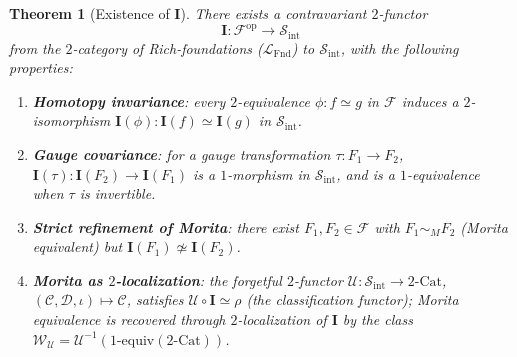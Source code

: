 \documentclass[11pt]{article}
\theoremstyle{plain}
\newtheorem{theorem}{Theorem}[section]
\theoremstyle{definition}
\newcommand{\cS}{\mathcal{S}}
\newcommand{\cF}{\mathcal{F}}
\newcommand{\cC}{\mathcal{C}}
\newcommand{\cD}{\mathcal{D}}
\newcommand{\LFnd}{\mathcal{L}_{\mathrm{Fnd}}}
\newcommand{\Sint}{\cS_{\mathrm{int}}}
\newcommand{\Cat}{\mathrm{Cat}}
\newcommand{\II}{\mathbf{I}}
\newcommand{\cU}{\mathcal{U}}
\begin{document}
\begin{theorem}[Existence of $\II$]\label{thm:I-existence}
There exists a contravariant $2$-functor
\[ \II : \cF^{\mathrm{op}} \to \Sint \]
from the $2$-category of Rich-foundations ($\LFnd$) to $\Sint$, with the following properties:
\begin{enumerate}
\item[\textbf{(I-1)}] \textbf{Homotopy invariance}: every $2$-equivalence $\phi : f \simeq g$ in $\cF$ induces a $2$-isomorphism $\II(\phi) : \II(f) \simeq \II(g)$ in $\Sint$.
\item[\textbf{(I-2)}] \textbf{Gauge covariance}: for a gauge transformation $\tau : F_1 \to F_2$, $\II(\tau) : \II(F_2) \to \II(F_1)$ is a $1$-morphism in $\Sint$, and is a $1$-equivalence when $\tau$ is invertible.
\item[\textbf{(I-3)}] \textbf{Strict refinement of Morita}: there exist $F_1, F_2 \in \cF$ with $F_1 \sim_M F_2$ (Morita equivalent) but $\II(F_1) \not\simeq \II(F_2)$.
\item[\textbf{(I-4)}] \textbf{Morita as $2$-localization}: the forgetful $2$-functor $\cU : \Sint \to 2\text{-}\Cat$, $(\cC, \cD, \iota) \mapsto \cC$, satisfies $\cU \circ \II \simeq \rho$ (the classification functor); Morita equivalence is recovered through $2$-localization of $\II$ by the class $\mathcal{W}_\cU = \cU^{-1}(1\text{-equiv}(2\text{-}\Cat))$.
\end{enumerate}
\end{theorem}
\end{document}
